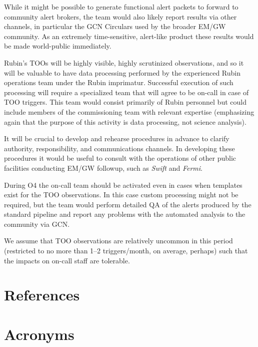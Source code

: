 \documentclass[DM,authoryear,toc]{lsstdoc}
\begin{document}
While it might be possible to generate functional alert packets to forward to community alert brokers, the team would also likely report results via other channels, in particular the GCN Circulars used by the broader EM/GW community.
As an extremely time-sensitive, alert-like product these results would be made world-public immediately.

Rubin's TOOs will be highly visible, highly scrutinized observations, and so it will be valuable to have data processing performed by the experienced Rubin operations team under the Rubin imprimatur.
Successful execution of such processing will require a specialized team that will agree to be on-call in case of TOO triggers.
This team would consist primarily of Rubin personnel but could include members of the commissioning team with relevant expertise (emphasizing again that the purpose of this activity is data processing, not science analysis).

It will be crucial to develop and rehearse procedures in advance to clarify authority, responsibility, and communications channels. 
In developing these procedures it would be useful to consult with the operations of other public facilities conducting EM/GW followup, such as \textit{Swift} and \textit{Fermi}.

During O4 the on-call team should be activated even in cases when templates exist for the TOO observations.
In this case custom processing might not be required, but the team would perform detailed QA of the alerts produced by the standard pipeline and report any problems with the automated analysis to the community via GCN.

We assume that TOO observations are relatively uncommon in this period (restricted to no more than 1--2 triggers/month, on average, perhaps) such that the impacts on on-call staff are tolerable.  


\appendix
\section{References} \label{sec:bib}
\renewcommand{\refname}{} %


\section{Acronyms} \label{sec:acronyms}

\end{document}

